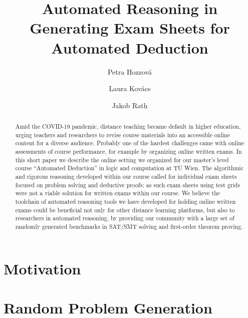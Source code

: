 \documentclass[12pt]{llncs}
\title{Automated Reasoning in Generating Exam Sheets for Automated Deduction}
\author{Petra Hozzov\'a\and
Laura Kov\'acs \and
Jakob Rath}
\institute{
    TU Wien, Austria
}
\begin{document}
\maketitle





\begin{abstract}
Amid the COVID-19 pandemic, distance teaching became default in higher education,
urging teachers and researchers to revise course materials into an 
accessible online content for a diverse audience. Probably one of the hardest challenges %
came with online assessments of course performance, for example by
organizing online written exams. 
In this short paper we describe the online 
setting  we organized for our master's level course ``Automated
Deduction'' in logic and computation at TU Wien.
The algorithmic and rigorous reasoning developed within our
course called for individual exam sheets focused on problem solving and deductive
proofs; as such exam sheets using test grids were not a viable solution
for written exams within our course.
We believe the toolchain of automated reasoning tools we have developed for
holding online written exams could be beneficial not only for other
distance learning platforms, but also to researchers in automated
reasoning, by providing our community with a large set of randomly generated benchmarks in SAT/SMT solving and first-order theorem proving.
\end{abstract}





\section{Motivation}





%



\section{Random Problem Generation}\label{sec:satfo}
\end{document}
